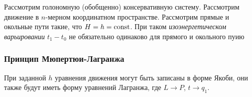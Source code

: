 \begin{to_def} 
    Рассмотрим голономную (обобщенно) консервативную систему. Рассмотрим движение в $n$-мерном координатном пространстве. Рассмотрим прямые и окольные пути такие, что $H = h = \text{const}$. При таком \textit{изоэнергетическом варьировании} $t_1-t_0$ не обязательно одинаково для прямого и окольного пуию     
\end{to_def}

\subsubsection*{Принцип Мюпертюи-Лагранжа}

При заданной $h$ уравнения движения могут быть записаны в форме Якоби, они также будут иметь форму уравнений Лагранжа, где $L \to P$, $t \to q_1$.





















